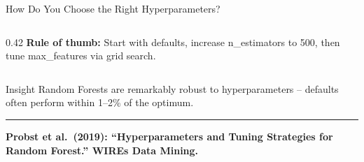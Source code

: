 \documentclass[8pt,aspectratio=169]{beamer}
\newcommand{\bottomnote}[1]{%
\vfill
\vspace{-2mm}
\textcolor{mllavender2}{\rule{\textwidth}{0.4pt}}
\vspace{1mm}
\footnotesize
\textbf{#1}
}
\begin{document}
\begin{frame}{How Do You Choose the Right Hyperparameters?}
\begin{columns}[T]
\begin{column}{0.42\textwidth}
\vspace{0.5em}
\scriptsize
\textbf{Rule of thumb:} Start with defaults, increase n\_estimators to 500, then tune max\_features via grid search.
\end{column}
\end{columns}

\begin{block}{Insight}
\scriptsize Random Forests are remarkably robust to hyperparameters -- defaults often perform within 1--2\% of the optimum.
\end{block}
\bottomnote{Probst et al.\ (2019): ``Hyperparameters and Tuning Strategies for Random Forest.'' WIREs Data Mining.}
\end{frame}


\end{document}
